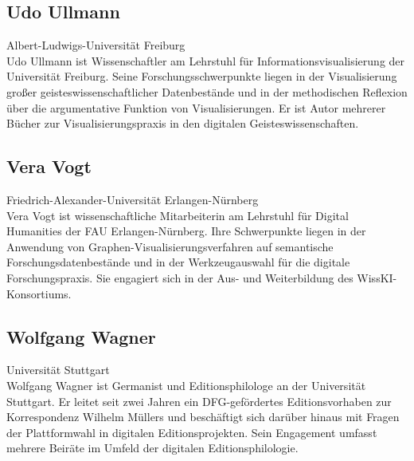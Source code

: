 \subsection*{Udo Ullmann}
\noindent\small Albert-Ludwigs-Universität Freiburg \\
Udo Ullmann ist Wissenschaftler am Lehrstuhl für Informationsvisualisierung der Universität Freiburg. Seine Forschungsschwerpunkte liegen in der Visualisierung großer geisteswissenschaftlicher Datenbestände und in der methodischen Reflexion über die argumentative Funktion von Visualisierungen. Er ist Autor mehrerer Bücher zur Visualisierungspraxis in den digitalen Geisteswissenschaften.

\subsection*{Vera Vogt}
\noindent\small Friedrich-Alexander-Universität Erlangen-Nürnberg \\
Vera Vogt ist wissenschaftliche Mitarbeiterin am Lehrstuhl für Digital Humanities der FAU Erlangen-Nürnberg. Ihre Schwerpunkte liegen in der Anwendung von Graphen-Visualisierungsverfahren auf semantische Forschungsdatenbestände und in der Werkzeugauswahl für die digitale Forschungspraxis. Sie engagiert sich in der Aus- und Weiterbildung des WissKI-Konsortiums.

\subsection*{Wolfgang Wagner}
\noindent\small Universität Stuttgart \\
Wolfgang Wagner ist Germanist und Editionsphilologe an der Universität Stuttgart. Er leitet seit zwei Jahren ein DFG-gefördertes Editionsvorhaben zur Korrespondenz Wilhelm Müllers und beschäftigt sich darüber hinaus mit Fragen der Plattformwahl in digitalen Editionsprojekten. Sein Engagement umfasst mehrere Beiräte im Umfeld der digitalen Editionsphilologie.
